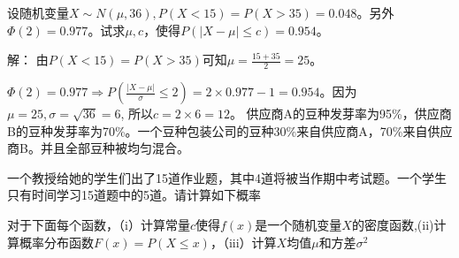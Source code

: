 \documentclass[11pt,addpoints,landscape]{exam}
\begin{document}
	\begin{multicols}{2}
	
	\begin{questions} %
	\question[8]
	设随机变量$X\sim N(\mu, 36), P(X < 15) = P(X > 35) = 0.048$。另外$\Phi(2) = 0.977$。试求$\mu, c$，使得$P(|X - \mu| \leq c) = 0.954$。
	
	解：
	由$P(X < 15) = P(X > 35)$可知$\mu = \frac{15 + 35}{2} = 25$。
	
	$\Phi(2) = 0.977 \Rightarrow P(\frac{|X - \mu|}{\sigma} \leq 2) = 2 \times 0.977 - 1 = 0.954$。因为$\mu = 25, \sigma = \sqrt{36} = 6$, 所以$c = 2 \times 6 = 12$。
	\question
		供应商A的豆种发芽率为95\%，供应商B的豆种发芽率为70\%。一个豆种包装公司的豆种30\%来自供应商A，70\%来自供应商B。并且全部豆种被均匀混合。
		
	 	\question
	 	一个教授给她的学生们出了15道作业题，其中4道将被当作期中考试题。一个学生只有时间学习15道题中的5道。请计算如下概率
	   \question
	 	对于下面每个函数，（i）计算常量$c$使得$f(x)$是一个随机变量$X$的密度函数,(ii)计算概率分布函数$F(x) = P(X \leq x)$，（iii）计算$X$均值$\mu$和方差$\sigma ^ 2$
	 	\begin{parts}

\end{parts}
\end{questions}
\end{multicols}
\end{document}

